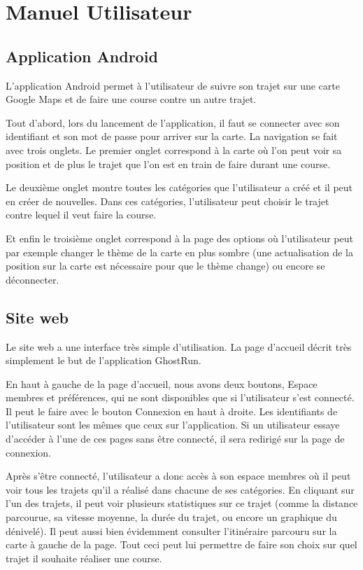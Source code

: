 \chapter{Manuel Utilisateur}

\section{Application Android}

L'application Android permet à l'utilisateur de suivre son trajet sur une carte Google Maps et de faire une course contre un autre trajet.

Tout d'abord, lors du lancement de l'application, il faut se connecter avec son identifiant et son mot de passe pour arriver sur la carte. La navigation se fait avec trois onglets. Le premier onglet correspond à la carte où l'on peut voir sa position et de plus le trajet que l'on est en train de faire durant une course.

Le deuxième onglet montre toutes les catégories que l'utilisateur a créé et il peut en créer de nouvelles. Dans ces catégories, l'utilisateur peut choisir le trajet contre lequel il veut faire la course.

Et enfin le troisième onglet correspond à la page des options où l'utilisateur peut par exemple changer le thème de la carte en plus sombre (une actualisation de la position sur la carte est nécessaire pour que le thème change) ou encore se déconnecter.

\section{Site web}

Le site web a une interface très simple d'utilisation. La page d'accueil décrit très simplement le but de l'application GhostRun.

En haut à gauche de la page d'accueil, nous avons deux boutons, Espace membres et préférences, qui ne sont disponibles que si l'utilisateur s'est connecté. Il peut le faire avec le bouton Connexion en haut à droite. Les identifiants de l'utilisateur sont les mêmes que ceux sur l'application. Si un utilisateur essaye d'accéder à l'une de ces pages sans être connecté, il sera redirigé sur la page de connexion.

Après s'être connecté, l'utilisateur a donc accès à son espace membres où il peut voir tous les trajets qu'il a réalisé dans chacune de ses catégories. En cliquant sur l'un des trajets, il peut voir plusieurs statistiques sur ce trajet (comme la distance parcourue, sa vitesse moyenne, la durée du trajet, ou encore un graphique du dénivelé). Il peut aussi bien évidemment consulter l'itinéraire parcouru sur la carte à gauche de la page. Tout ceci peut lui permettre de faire son choix sur quel trajet il souhaite réaliser une course.

